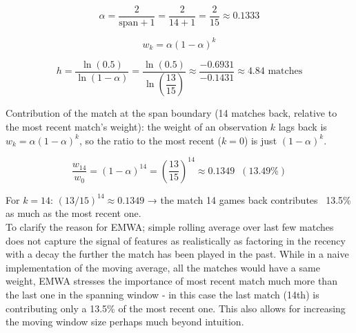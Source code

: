\documentclass{article}
\begin{document}
\begin{equation}
\alpha = \frac{2}{\text{span}+1} = \frac{2}{14+1} = \frac{2}{15} \approx 0.1333
\end{equation}

\begin{equation}
w_k = \alpha (1-\alpha)^k
\end{equation}

\begin{equation}
h = \frac{\ln(0.5)}{\ln(1-\alpha)} = \frac{\ln(0.5)}{\ln\left(\dfrac{13}{15}\right)} \approx \frac{-0.6931}{-0.1431} \approx 4.84 \text{ matches}
\end{equation}

Contribution of the match at the span boundary (14 matches back, relative to the most recent match's weight): the weight of an observation $k$ lags back is $w_k = \alpha(1-\alpha)^k$, so the ratio to the most recent ($k=0$) is just $(1-\alpha)^k$.

\begin{equation}
\frac{w_{14}}{w_0} = (1-\alpha)^{14} = \left(\frac{13}{15}\right)^{14} \approx 0.1349 \;\; (13.49\%)
\end{equation}

For $k=14$: $(13/15)^{14} \approx 0.1349$ → the match 14 games back contributes ~13.5\% as much as the most recent one.
\\
To clarify  the reason for EMWA; simple rolling average over last few matches does not capture the signal of features as realistically as factoring in the recency with a decay the further the match has been played in the past. While in a naive implementation of the moving average, all the matches would have a same weight, EMWA stresses the importance of most recent match much more than the last one in the spanning window - in this case the last match (14th) is contributing only a 13.5\% of the most recent one. This also allows for increasing the moving window size perhaps much beyond intuition.
\end{document}
